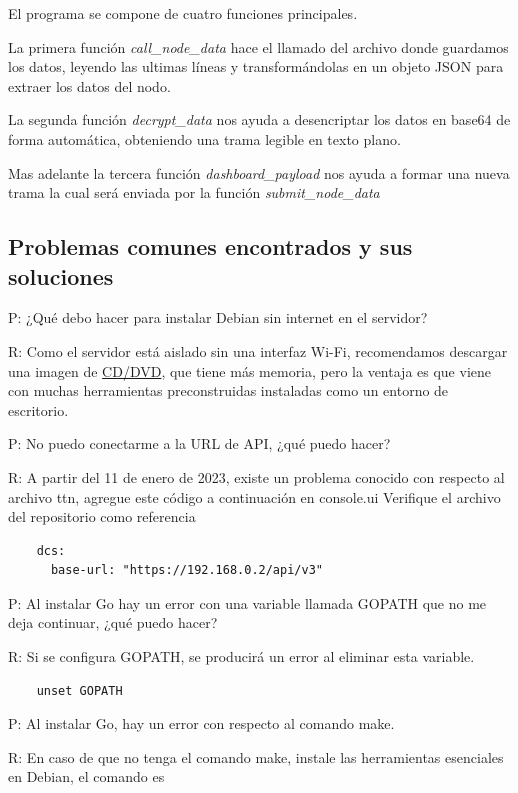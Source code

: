 El programa se compone de cuatro funciones principales.

La primera función \textit{call\_node\_data} hace el llamado del archivo donde guardamos los datos,
leyendo las ultimas líneas y transformándolas en un objeto JSON para extraer los datos del nodo.

La segunda función \textit{decrypt\_data} nos ayuda a desencriptar los datos en base64 de forma
automática, obteniendo una trama legible en texto plano.

Mas adelante la tercera función \textit{dashboard\_payload} nos ayuda a formar una nueva trama la
cual será enviada por la función \textit{submit\_node\_data}

\subsection{Problemas comunes encontrados y sus soluciones}

P: ¿Qué debo hacer para instalar Debian sin internet en el servidor?

R: Como el servidor está aislado sin una interfaz Wi-Fi, recomendamos descargar una imagen de
\href{https://www.debian.org/CD/http-ftp/}{CD/DVD}, que tiene más memoria, pero la ventaja es que
viene con muchas herramientas preconstruidas instaladas como un entorno de escritorio.

P: No puedo conectarme a la URL de API, ¿qué puedo hacer?

R: A partir del 11 de enero de 2023, existe un problema conocido con respecto al archivo ttn,
agregue este código a continuación en console.ui Verifique el archivo del repositorio como
referencia

\begin{lstlisting}
    dcs:
      base-url: "https://192.168.0.2/api/v3"
\end{lstlisting}

P: Al instalar Go hay un error con una variable llamada GOPATH que no me deja continuar, ¿qué puedo
hacer?

R: Si se configura GOPATH, se producirá un error al eliminar esta variable.

\begin{lstlisting}
    unset GOPATH
\end{lstlisting}

P: Al instalar Go, hay un error con respecto al comando make.

R: En caso de que no tenga el comando make, instale las herramientas esenciales en Debian, el
comando es

